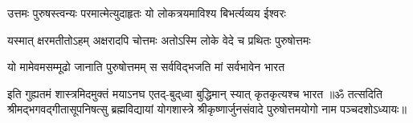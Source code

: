 \twolineshloka
{उत्तमः पुरुषस्त्वन्यः परमात्मेत्युदाहृतः}
{यो लोकत्रयमाविश्य बिभर्त्यव्यय ईश्वरः}%

\twolineshloka
{यस्मात् क्षरमतीतोऽहम् अक्षरादपि चोत्तमः}
{अतोऽस्मि लोके वेदे च प्रथितः पुरुषोत्तमः}%

\twolineshloka
{यो मामेवमसम्मूढो जानाति पुरुषोत्तमम्}
{स सर्वविद्भजति मां सर्वभावेन भारत}%

\twolineshloka
{इति गुह्यतमं शास्त्रमिदमुक्तं मयाऽनघ}
{एतद्-बुद्‌ध्वा बुद्धिमान् स्यात् कृतकृत्यश्च भारत}%
{॥ॐ तत्सदिति श्रीमद्भगवद्गीतासूपनिषत्सु ब्रह्मविद्यायां योगशास्त्रे श्रीकृष्णार्जुनसंवादे पुरुषोत्तमयोगो नाम पञ्चदशोऽध्यायः॥}